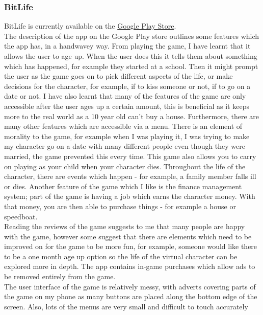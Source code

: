 \subsubsection{BitLife}
BitLife is currently available on the \href{https://play.google.com/store/apps/details?id=com.candywriter.bitlife}{Google Play Store}.\\
The description of the app on the Google Play store outlines some features which the app has, in a handwavey way.
From playing the game, I have learnt that it allows the user to age up. When the user does this it tells them about something which has happened, for example they started at a school. Then it might prompt the user as the game goes on to pick different aspects of the life, or make decisions for the character, for example, if to kiss someone or not, if to go on a date or not. I have also learnt that many of the features of the game are only accessible after the user ages up a certain amount, this is beneficial as it keeps more to the real world as a 10 year old can’t buy a house. Furthermore, there are many other features which are accessible via a menu. There is an element of morality to the game, for example when I was playing it, I was trying to make my character go on a date with many different people even though they were married, the game prevented this every time. This game also allows you to carry on playing as your child when your character dies. Throughout the life of the character, there are events which happen - for example, a family member falls ill or dies. Another feature of the game which I like is the finance management system; part of the game is having a job which earns the character money. With that money, you are then able to purchase things - for example a house or speedboat.\\
Reading the reviews of the game suggests to me that many people are happy with the game, however some suggest that there are elements which need to be improved on for the game to be more fun, for example, someone would like there to be a one month age up option so the life of the virtual character can be explored more in depth.
The app contains in-game purchases which allow ads to be removed entirely from the game.\\
The user interface of the game is relatively messy, with adverts covering parts of the game on my phone as many buttons are placed along the bottom edge of the screen. Also, lots of the menus are very small and difficult to touch accurately 
